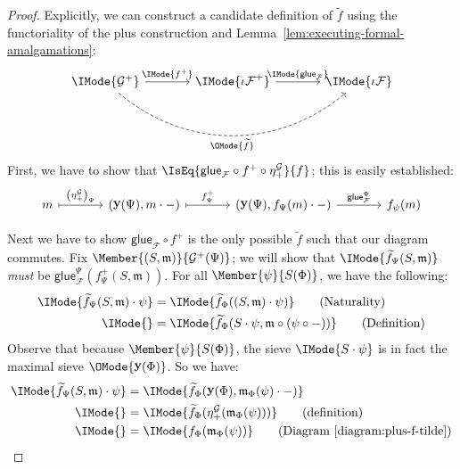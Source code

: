 \documentclass{article}
\newcommand\AIsEq[2]{\IMode{#1} &=\IMode{#2}}
\DeclareMathOperator\OpYoneda{\mathbf{y}}
\newcommand\Yoneda[1]{\OpYoneda({#1})}
\newcommand\Plus[1]{{#1}^+}
\newcommand\Glue[1]{\mathsf{glue}_{#1}}
\begin{document}
\begin{proof}
  Explicitly, we can construct a candidate definition of
  $\widetilde{f}$ using the functoriality of the plus construction and
  Lemma~\ref{lem:executing-formal-amalgamations}:
  \[
    \begin{tikzcd}[sep=large]
      \IMode{\Plus{\mathcal{G}}}
      \arrow[r,"\IMode{\Plus{f}}"]
      \arrow[rr,swap,dashed,bend right=40,"\OMode{\widetilde{f}}"]
      &
      \IMode{\Plus{\iota\mathcal{F}}}
      \arrow[r,"\IMode{\Glue{\mathcal{F}}}"]
      &
      \IMode{\iota\mathcal{F}}
    \end{tikzcd}
  \]
%
  First, we have to show that
  $\IsEq{\Glue{\mathcal{F}}\circ\Plus{f}\circ\eta_+^{\mathcal{G}}}{f}$;
  this is easily established:
  \[
    \begin{tikzcd}[sep=large]
      m
      \arrow[r,mapsto,"\left(\eta_+^{\mathcal{G}}\right)_\Psi"]
      &
      (\Yoneda{\Psi},m\cdot-)
      \arrow[r,mapsto,"\Plus{f}_\Psi"]
      &
      (\Yoneda{\Psi},f_\Psi(m)\cdot-)
      \arrow[r,"\Glue{\mathcal{F}}^\Psi"]
      &
      f_\psi(m)
    \end{tikzcd}
  \]

  Next we have to show $\Glue{\mathcal{F}}\circ\Plus{f}$ is the only
  possible $\widetilde{f}$ such that our diagram commutes.
%
  Fix $\Member{(S,\mathfrak{m})}{\Plus{\mathcal{G}}(\Psi)}$; we will
  show that $\IMode{\widetilde{f}_\Psi(S,\mathfrak{m})}$ \emph{must}
  be $\Glue{\mathcal{F}}^\Psi(\Plus{f}_\Psi(S,\mathfrak{m}))$.
%
  For all $\Member{\psi}{S(\Phi)}$, we have the following:
  \begin{align*}
    \AIsEq{
      \widetilde{f}_\Psi(S,\mathfrak{m})\cdot\psi
    }{
      \widetilde{f}_\Phi((S,\mathfrak{m})\cdot\psi)
    }
    \tag{Naturality}
    \\
    \AIsEq{
    }{
      \widetilde{f}_\Phi(S\cdot\psi,\mathfrak{m}\circ(\psi\circ-))
    }
    \tag{Definition}
  \end{align*}
%
  Observe that because $\Member{\psi}{S(\Phi)}$, the sieve
  $\IMode{S\cdot\psi}$ is in fact the maximal sieve
  $\OMode{\Yoneda{\Phi}}$. So we have:
  \begin{align*}
    \AIsEq{
      \widetilde{f}_\Psi(S,\mathfrak{m})\cdot\psi
    }{
      \widetilde{f}_\Phi(\Yoneda{\Phi},\mathfrak{m}_\Phi(\psi)\cdot-)
    }
    \\
    \AIsEq{
    }{
      \widetilde{f}_\Phi(\eta_+^{\mathcal{G}}(\mathfrak{m}_\Phi(\psi)))
    }
    \tag{definition}
    \\
    \AIsEq{
    }{
      f_\Phi(\mathfrak{m}_\Phi(\psi))
    }
    \tag{Diagram~\ref{diagram:plus-f-tilde}}
  \end{align*}


\end{proof}
\end{document}
